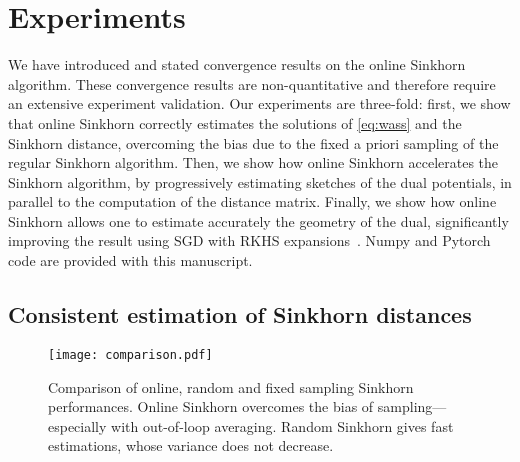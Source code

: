 \section{Experiments}\label{sec:exps}

We have introduced and stated convergence results on the online Sinkhorn
algorithm. These convergence results are non-quantitative and therefore require
an extensive experiment validation. Our experiments are three-fold: first, we
show that online Sinkhorn correctly estimates the solutions of
\eqref{eq:wass} and the Sinkhorn distance, overcoming the bias due to the fixed
a priori sampling of the regular Sinkhorn algorithm. Then, we show how online
Sinkhorn accelerates the Sinkhorn algorithm, by progressively estimating
sketches of the dual potentials, in parallel to the computation of the distance
matrix. Finally, we show how online Sinkhorn allows one to estimate accurately
the geometry of the dual, significantly improving the result using SGD with RKHS
expansions~\citep{2016-genevay-nips}. Numpy and Pytorch code are provided with
this manuscript.

\subsection{Consistent estimation of Sinkhorn distances}

\begin{figure}[t]
    \centering
    \texttt{[image: comparison.pdf]}

    \vspace{-1em}

    \caption{Comparison of online, random and fixed sampling Sinkhorn performances. Online Sinkhorn overcomes the bias of sampling---especially with out-of-loop averaging. Random Sinkhorn gives fast estimations, whose variance does not decrease.}
    \label{fig:convergence}
\end{figure}


